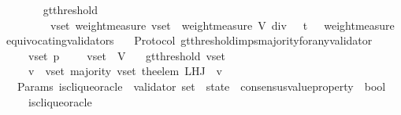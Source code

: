 \begin{isabellebody}
\ \ \isanewline
\ \ \ \ {\isachardoublequoteopen}gt{\isacharunderscore}threshold\ \isanewline
\ \ \ \ \ \ \ {\isacharequal}\ {\isacharparenleft}{\isasymlambda}{\isacharparenleft}v{\isacharunderscore}set{\isacharcomma}\ {\isasymsigma}{\isacharparenright}{\isachardot}{\isacharparenleft}weight{\isacharunderscore}measure\ v{\isacharunderscore}set\ {\isachargreater}\ {\isacharparenleft}weight{\isacharunderscore}measure\ V{\isacharparenright}\ div\ {}\ {\isacharplus}\ t\ \ {\isacharminus}\ weight{\isacharunderscore}measure\ {\isacharparenleft}equivocating{\isacharunderscore}validators\ {\isasymsigma}{\isacharparenright}{\isacharparenright}{\isacharparenright}{\isachardoublequoteclose}\isanewline
\isanewline
\isanewline
{}\isamarkupfalse%
\ {\isacharparenleft}\ Protocol{\isacharparenright}\ gt{\isacharunderscore}threshold{\isacharunderscore}imps{\isacharunderscore}majority{\isacharunderscore}for{\isacharunderscore}any{\isacharunderscore}validator\ {\isacharcolon}\isanewline
\ \ {\isachardoublequoteopen}{\isasymforall}\ {\isasymsigma}\ v{\isacharunderscore}set\ p{\isachardot}\ {\isasymsigma}\ {\isasymin}\ {\isasymSigma}\ {\isasymand}\ v{\isacharunderscore}set\ {\isasymsubseteq}\ V\isanewline
\ \ {\isasymlongrightarrow}\ gt{\isacharunderscore}threshold\ {\isacharparenleft}v{\isacharunderscore}set{\isacharcomma}\ {\isasymsigma}{\isacharparenright}\ \isanewline
\ \ {\isasymlongrightarrow}\ {\isacharparenleft}{\isasymforall}\ v\ {\isasymin}\ v{\isacharunderscore}set{\isachardot}\ majority\ {\isacharparenleft}v{\isacharunderscore}set{\isacharcomma}\ the{\isacharunderscore}elem\ {\isacharparenleft}L{\isacharunderscore}H{\isacharunderscore}J\ {\isasymsigma}\ v{\isacharparenright}{\isacharparenright}{\isacharparenright}{\isachardoublequoteclose}\isanewline
%
\isadelimproof
\ \ %
\endisadelimproof
%
\isatagproof
{}\isamarkupfalse%
%
\endisatagproof
{\isafoldproof}%
%
\isadelimproof
\isanewline
%
\endisadelimproof
\isanewline
\isanewline
{}\isamarkupfalse%
\ {\isacharparenleft}\ Params{\isacharparenright}\ is{\isacharunderscore}clique{\isacharunderscore}oracle\ {\isacharcolon}{\isacharcolon}\ {\isachardoublequoteopen}{\isacharparenleft}validator\ set\ {\isacharasterisk}\ state\ {\isacharasterisk}\ consensus{\isacharunderscore}value{\isacharunderscore}property{\isacharparenright}\ {\isasymRightarrow}\ bool{\isachardoublequoteclose}\isanewline
\ \ \isanewline
\ \ \ \ {\isachardoublequoteopen}is{\isacharunderscore}clique{\isacharunderscore}oracle\ \isanewline

\end{isabellebody}
